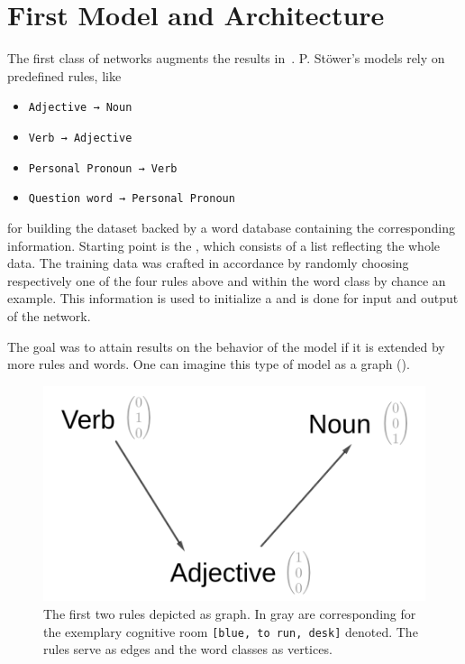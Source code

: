 \section{First Model and Architecture} \label{subsec: first model and architecture}
The first class of networks augments the results in~\cite{Stöwer21MA}. P. Stöwer's models rely on predefined rules, like

\begin{itemize}
\label{enum: rule set}
	\item \texttt{Adjective → Noun}
	\item \texttt{Verb → Adjective}
	\item \texttt{Personal Pronoun → Verb}
	\item \texttt{Question word → Personal Pronoun}
\end{itemize}
for building the dataset backed by a word database containing the corresponding information. Starting point is the \cognitiveroom{}, which consists of a list reflecting the whole data. The training data was crafted in accordance by randomly choosing respectively one of the four rules above and within the word class by chance an example. This information is used to initialize a \onehot{} and is done for input and output of the network.

The goal was to attain results on the behavior of the model if it is extended by more rules and words. One can imagine this type of model as a graph (\figref{\ref{fig: first model graph}}).

\begin{figure}
    \centering
    \includegraphics[scale=0.35]{Bilder/Graphen/first_model_graph2.png}
    \caption{The first two rules depicted as graph. In gray are corresponding  for the exemplary cognitive room \texttt{[blue, to run, desk]} denoted. The rules serve as edges and the word classes as vertices.}
    \label{fig: first model graph}
\end{figure}
